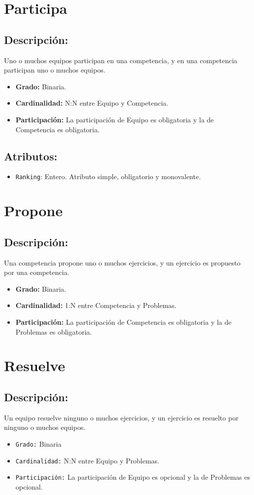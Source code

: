 \documentclass[doc, 12pt, donotrepeattitle]{apa6}
\begin{document}
\section*{Participa}
\subsection*{Descripción:}
Uno o muchos equipos participan en una competencia, y en una competencia participan uno o muchos equipos.
\begin{itemize}
\item \textbf{Grado:} Binaria.
\item \textbf{Cardinalidad:} N:N entre Equipo y Competencia.
\item \textbf{Participación:} La participación de Equipo es obligatoria y la de Competencia es obligatoria.
\end{itemize}

\subsection*{Atributos:}
\begin{itemize}
\item \texttt{Ranking}: Entero. Atributo simple, obligatorio y monovalente.
\end{itemize}

\section*{Propone}
\subsection*{Descripción:}
Una competencia propone uno o muchos ejercicios, y un ejercicio es propuesto por una competencia.
\begin{itemize}
\item \textbf{Grado:} Binaria.
\item \textbf{Cardinalidad:} 1:N entre Competencia y Problemas.
\item \textbf{Participación:} La participación de Competencia es obligatoria y la de Problemas es obligatoria.
\end{itemize}

\newpage
\section*{Resuelve}
\subsection*{Descripción:}
Un equipo resuelve ninguno o muchos ejercicios, y un ejercicio es resuelto por ninguno o muchos equipos.
\begin{itemize}
\item \texttt{Grado:} Binaria
\item \texttt{Cardinalidad:} N:N entre Equipo y Problemas.
\item \texttt{Participación:} La participación de Equipo es opcional y la de Problemas es opcional.
\end{itemize}
\end{document}
